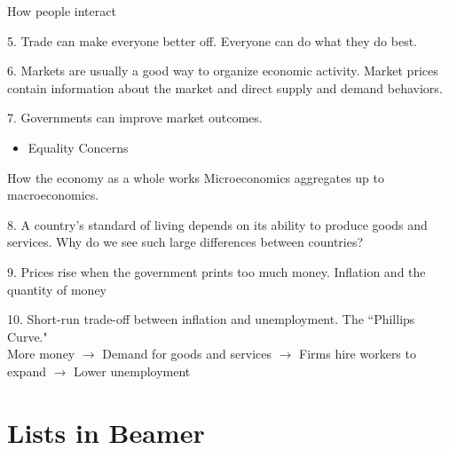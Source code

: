 \documentclass[aspectratio=169]{beamer}
\begin{document}
\begin{frame}{How people interact}
    \medskip

    \begin{block}{5. Trade can make everyone better off.}
        Everyone can do what they do best.
    \end{block}

    \begin{block}{6. Markets are usually a good way to organize economic activity.}
        Market prices contain information about the market and direct supply and demand behaviors.
    \end{block}

    \begin{block}{7. Governments can improve market outcomes.}
        \begin{itemize}
        \item Equality Concerns

        \end{itemize}
    \end{block}
\end{frame} 

\begin{frame}{How the economy as a whole works}
    Microeconomics aggregates up to macroeconomics.

    \medskip

    \begin{block}{8. A country's standard of living depends on its ability to produce goods and services.}
        Why do we see such large differences between countries?
    \end{block}

    \begin{block}{9. Prices rise when the government prints too much money.}
        Inflation and the quantity of money
    \end{block}

    \begin{block}{10. Short-run trade-off between inflation and unemployment.}
        The ``Phillips Curve."\\
        More money $\rightarrow$ Demand for goods and services $\rightarrow$ Firms hire workers to expand $\rightarrow$ Lower unemployment
    \end{block}
    \section{Lists in Beamer}
\end{frame} 
\end{document}

